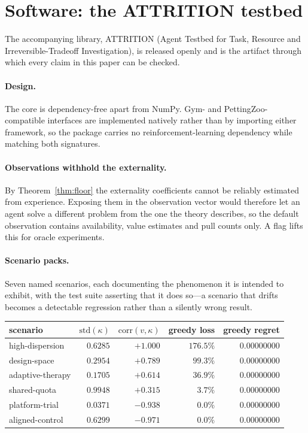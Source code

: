 \section{Software: the ATTRITION testbed}
\label{sec:software}

The accompanying library, ATTRITION (Agent Testbed for Task, Resource and Irreversible-Tradeoff Investigation), is released openly and is the artifact through which every
claim in this paper can be checked.

\paragraph{Design.} The core is dependency-free apart from NumPy. Gym- and
PettingZoo-compatible interfaces are implemented natively rather than by importing
either framework, so the package carries no reinforcement-learning dependency while
matching both signatures.

\paragraph{Observations withhold the externality.} By Theorem~\ref{thm:floor} the
externality coefficients cannot be reliably estimated from experience. Exposing
them in the observation vector would therefore let an agent solve a different
problem from the one the theory describes, so the default observation contains
availability, value estimates and pull counts only. A flag lifts this for oracle
experiments.

\paragraph{Scenario packs.} Seven named scenarios, each documenting the phenomenon
it is intended to exhibit, with the test suite asserting that it does so---a
scenario that drifts becomes a detectable regression rather than a silently wrong
result.

\begin{center}
\begin{tabular}{lrrrr}
\toprule
scenario & $\mathrm{std}(\kappa)$ & $\mathrm{corr}(v,\kappa)$ & greedy loss & greedy regret \\
\midrule
high-dispersion & $0.6285$ & $+1.000$ & $176.5\%$ & $0.00000000$ \\
design-space & $0.2954$ & $+0.789$ & $99.3\%$ & $0.00000000$ \\
adaptive-therapy & $0.1705$ & $+0.614$ & $36.9\%$ & $0.00000000$ \\
shared-quota & $0.9948$ & $+0.315$ & $3.7\%$ & $0.00000000$ \\
platform-trial & $0.0371$ & $-0.938$ & $\mathbf{0.0\%}$ & $0.00000000$ \\
aligned-control & $0.6299$ & $-0.971$ & $\mathbf{0.0\%}$ & $0.00000000$ \\
\bottomrule
\end{tabular}
\end{center}

